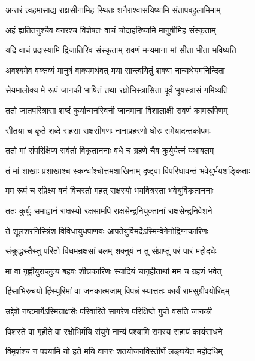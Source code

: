 \twolineshloka
{अन्तरं त्वहमासाद्य राक्षसीनामिह स्थितः}
{शनैराश्वासयिष्यामि संतापबहुलामिमाम्} %

\twolineshloka
{अहं ह्यतितनुश्चैव वनरश्च विशेषतः}
{वाचं चोदाहरिष्यामि मानुषीमिह संस्कृताम्} %

\twolineshloka
{यदि वाचं प्रदास्यामि द्विजातिरिव संस्कृताम्}
{रावणं मन्यमाना मां सीता भीता भविष्यति} %

\twolineshloka
{अवश्यमेव वक्तव्यं मानुषं वाक्यमर्थवत्}
{मया सान्त्वयितुं शक्या नान्यथेयमनिन्दिता} %

\twolineshloka
{सेयमालोक्य मे रूपं जानकी भाषितं तथा}
{रक्षोभिस्त्रासिता पूर्वं भूयस्त्रासं गमिष्यति} %

\twolineshloka
{ततो जातपरित्रासा शब्दं कुर्यान्मनस्विनी}
{जानमाना विशालाक्षी रावणं कामरूपिणम्} %

\twolineshloka
{सीतया च कृते शब्दे सहसा राक्षसीगणः}
{नानाप्रहरणो घोरः समेयादन्तकोपमः} %

\twolineshloka
{ततो मां संपरिक्षिप्य सर्वतो विकृताननाः}
{वधे च ग्रहणे चैव कुर्युर्यत्नं यथाबलम्} %

\twolineshloka
{तं मां शाखाः प्रशाखाश्च स्कन्धांश्चोत्तमशाखिनाम्}
{दृष्ट्वा विपरिधावन्तं भवेयुर्भयशङ्किताः} %

\twolineshloka
{मम रूपं च संप्रेक्ष्य वनं विचरतो महत्}
{राक्षस्यो भयवित्रस्ता भवेयुर्विकृताननाः} %

\twolineshloka
{ततः कुर्युः समाह्वानं राक्षस्यो रक्षसामपि}
{राक्षसेन्द्रनियुक्तानां राक्षसेन्द्रनिवेशने} %

\twolineshloka
{ते शूलशरनिस्त्रिंश विविधायुधपाणयः}
{आपतेयुर्विमर्देऽस्मिन्वेगेनोद्विग्नकारिणः} %

\twolineshloka
{संक्रुद्धस्तैस्तु परितो विधमन्रक्षसां बलम्}
{शक्नुयं न तु संप्राप्तुं परं पारं महोदधेः} %

\twolineshloka
{मां वा गृह्णीयुराप्लुत्य बहवः शीघ्रकारिणः}
{स्यादियं चागृहीतार्था मम च ग्रहणं भवेत्} %

\twolineshloka
{हिंसाभिरुचयो हिंस्युरिमां वा जनकात्मजाम्}
{विपन्नं स्यात्ततः कार्यं रामसुग्रीवयोरिदम्} %

\twolineshloka
{उद्देशे नष्टमार्गेऽस्मिन्राक्षसैः परिवारिते}
{सागरेण परिक्षिप्ते गुप्ते वसति जानकी} %

\twolineshloka
{विशस्ते वा गृहीते वा रक्षोभिर्मयि संयुगे}
{नान्यं पश्यामि रामस्य सहायं कार्यसाधने} %

\twolineshloka
{विमृशंश्च न पश्यामि यो हते मयि वानरः}
{शतयोजनविस्तीर्णं लङ्घयेत महोदधिम्} %

